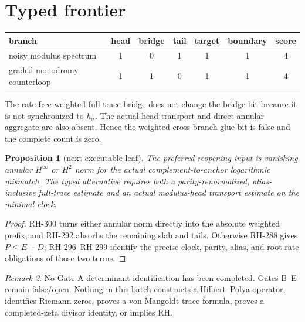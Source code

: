 \documentclass[11pt]{article}
\newtheorem{proposition}{Proposition}[section]
\theoremstyle{remark}\newtheorem{remark}[proposition]{Remark}
\begin{document}
\section{Typed frontier}
\begin{center}\small
\begin{tabular}{lccccc|c}\toprule
branch & head & bridge & tail & target & boundary & score\\\midrule
noisy modulus spectrum &1&0&1&1&1&4\\
graded monodromy counterloop &1&1&0&1&1&4\\\bottomrule
\end{tabular}
\end{center}
The rate-free weighted full-trace bridge does not change the bridge bit
because it is not synchronized to $h_\sigma$.  The actual head transport and
direct annular aggregate are also absent.  Hence the weighted cross-branch
glue bit is false and the complete count is zero.

\begin{proposition}[next executable leaf]
The preferred reopening input is vanishing annular $H^\infty$ or $H^2$ norm
for the actual complement-to-anchor logarithmic mismatch.  The typed
alternative requires both a parity-renormalized, alias-inclusive full-trace
estimate and an actual modulus-head transport estimate on the minimal clock.
\end{proposition}
\begin{proof}
RH-300 turns either annular norm directly into the absolute weighted prefix,
and RH-292 absorbs the remaining slab and tails.  Otherwise RH-288 gives
$P\le E+D$; RH-296--RH-299 identify the precise clock, parity, alias, and root
rate obligations of those two terms.
\end{proof}

\begin{remark}
No Gate-A determinant identification has been completed.  Gates B--E remain
false/open.  Nothing in this batch constructs a Hilbert--Polya operator,
identifies Riemann zeros, proves a von Mangoldt trace formula, proves a
completed-zeta divisor identity, or implies RH.
\end{remark}
\end{document}
